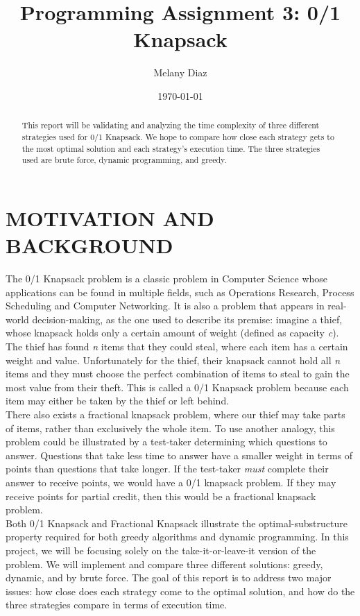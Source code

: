 \documentclass[12pt]{article}
\author{Melany Diaz}
\title{Programming Assignment 3: 0/1 Knapsack}
\date{\today}
\begin{document}
	
	\maketitle
	
	\begin{abstract}
    
    This report will be validating and analyzing the time complexity of three different strategies used for 0/1 Knapsack. We hope to compare how close each strategy gets to the most optimal solution and each strategy's execution time. The three strategies used are brute force, dynamic programming, and greedy.
		
	\end{abstract}
	
	\section*{MOTIVATION AND BACKGROUND}
	The 0/1 Knapsack problem is a classic problem in Computer Science whose applications can be found in multiple fields, such as Operations Research, Process Scheduling and Computer Networking. It is also a problem that appears in real-world decision-making, as the one used to describe its premise: imagine a thief, whose knapsack holds only a certain amount of weight (defined as capacity \textit{c}). The thief has found \textit{n} items that they could steal, where each item has a certain weight and value. Unfortunately for the thief, their knapsack cannot hold all \textit{n} items and they must choose the perfect combination of items to steal to gain the most value from their theft. This is called a 0/1 Knapsack problem because each item may either be taken by the thief or left behind. \\
	
	There also exists a fractional knapsack problem, where our thief may take parts of items, rather than exclusively the whole item. To use another analogy, this problem could be illustrated by a test-taker determining which questions to answer. Questions that take less time to answer have a smaller weight in terms of points than questions that take longer. If the test-taker \textit{must} complete their answer to receive points, we would have a 0/1 knapsack problem. If they may receive points for partial credit, then this would be a fractional knapsack problem. \\
	
	Both 0/1 Knapsack and Fractional Knapsack illustrate the optimal-substructure property required for both greedy algorithms and dynamic programming. In this project, we will be focusing solely on the take-it-or-leave-it version of the problem. We will implement and compare three different solutions: greedy, dynamic, and by brute force. The goal of this report is to address two major issues: how close does each strategy come to the optimal solution, and how do the three strategies compare in terms of execution time.\\
	
\end{document}
